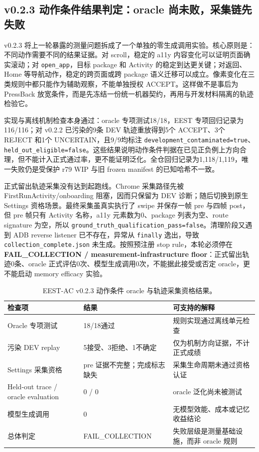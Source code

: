 \documentclass[12pt,a4paper]{ctexart}
\begin{document}
\subsection{v0.2.3 动作条件结果判定：oracle 尚未败，采集链先失败}

v0.2.3 将上一轮暴露的测量问题拆成了一个单独的零生成调用实验。核心原则是：不同动作需要不同的结果证据。对 scroll，稳定的 a11y 内容变化可以证明页面确实滚动；对 \texttt{open\_app}，目标 package 和 Activity 的稳定到达更关键；对返回、Home 等导航动作，稳定的跨页面或跨 package 语义迁移可以成立。像素变化在三类规则中都只能作为辅助观察，不能单独授权 ACCEPT。这样做不是事后为 PressBack 放宽条件，而是先冻结一份统一机器契约，再用与开发材料隔离的轨迹检验它。

实现与离线机制检查本身通过：oracle 专项测试18/18，EEST 专项回归记录为116/116；对 v0.2.2 已污染的9条 DEV 轨迹重放得到5个 ACCEPT、3个 REJECT 和1个 UNCERTAIN，且9/9均标注 \texttt{development\_contaminated=true}、\texttt{held\_out\_eligible=false}。这些结果说明动作条件判据在已见正负例上方向合理，但不能计入正式通过率，更不能证明泛化。全仓回归记录为1,118/1,119，唯一失败仍是受保护 r79 WIP 与旧 frozen manifest 的已知哈希不一致。

正式留出轨迹采集没有达到起跑线。Chrome 采集路径先被 FirstRunActivity/onboarding 阻塞，因而只保留为 DEV 诊断；随后切换到原生 Settings 资格场景。最终采集虽真实执行了 swipe 并保存一帧 pre 与四帧 post，但 pre 帧只有 Activity 名称，a11y 元素数为0、package 列表为空、route signature 为空，所以 \texttt{ground\_truth\_qualification\_pass=false}。清理阶段又遇到 ADB reverse listener 已不存在，异常从 \texttt{finally} 逸出，导致 \texttt{collection\_complete.json} 未生成。按照预注册 stop rule，本轮必须停在 \textbf{FAIL\_COLLECTION / measurement-infrastructure floor}：正式留出轨迹0条、oracle 正式评估0次、模型生成调用0次，不能据此接受或否定 oracle，更不能启动 memory efficacy 实验。

\begin{table}[H]
    \centering
    \caption{EEST-AC v0.2.3 动作条件 oracle 与轨迹采集资格结果。}
    \label{tab:eest-v023}
    \small
    \begin{tabularx}{\textwidth}{p{4.0cm}p{3.0cm}Y}
        \toprule
        检查项 & 结果 & 可支持的解释 \\
        \midrule
        Oracle 专项测试 & 18/18通过 & 规则实现通过离线单元检查 \\
        污染 DEV replay & 5接受、3拒绝、1不确定 & 仅为机制方向证据，不计正式成绩 \\
        Settings 采集资格 & pre 证据不完整；完成标志缺失 & 采集生命周期未通过资格认证 \\
        Held-out trace / oracle evaluation & 0 / 0 & oracle 泛化尚未被测试 \\
        模型生成调用 & 0 & 无模型效能、成本或记忆收益结论 \\
        总体判定 & FAIL\_\newline COLLECTION & 失败层级是测量基础设施，而非 oracle 规则 \\
        \bottomrule
    \end{tabularx}
\end{table}
\end{document}
